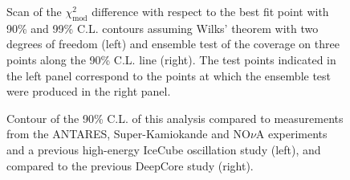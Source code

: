 \begin{figure}
    \centering
    
    \hfill
    
    \caption{Scan of the $\chi^2_{\mathrm{mod}}$ difference with respect to the best fit point with 90\% and 99\% C.L. contours assuming Wilks' theorem with two degrees of freedom (left) and ensemble test of the coverage on three points along the 90\% C.L. line (right). The test points indicated in the left panel correspond to the points at which the ensemble test were produced in the right panel.}
    \label{fig:sterile-contour-scan}
\end{figure}

\begin{figure}
    \centering

    
    
    \caption{Contour of the 90\% C.L. of this analysis compared to measurements from the ANTARES\cite{ANTARES:2018rtf}, Super-Kamiokande\cite{Super-Kamiokande:2014ndf} and NO$\nu$A\cite{nova-sterile} experiments and a previous high-energy IceCube oscillation study\cite{MEOWS} (left), and compared to the previous DeepCore study\cite{deepcore_sterile_2017} (right).}
    \label{fig:sterile-contour-context}
\end{figure}

%     
